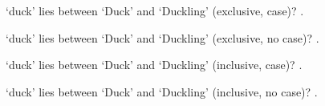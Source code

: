 \documentclass[12pt]{article}
\begin{document}
`duck' lies between `Duck' and `Duckling' (exclusive, case)?
. 

`duck' lies between `Duck' and `Duckling' (exclusive, no case)?
. 

`duck' lies between `Duck' and `Duckling' (inclusive, case)?
. 

`duck' lies between `Duck' and `Duckling' (inclusive, no case)?
. 
\end{document}
